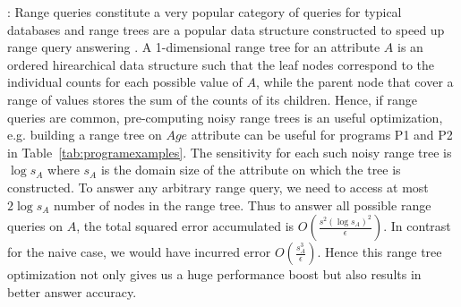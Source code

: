 \begin{comment}
For answering queries of the form $\phi=A_1==v_1\wedge \ldots  \wedge A_n==v_n$, ideally we just need to compute for $A_2==v_2\wedge \ldots \wedge A_n==v_n$ on $ct_{A,v}$ number of records starting from position $\sum_{i=1}^{i=v-1}ct_{A,i}$ of $\boldsymbol{\mathcal{\tilde{D}}}_{sort}$. 

However the \textsf{AS} has access only to the noisy CDF over the $k$ bins $ct_{A,i}$. Note that when $\bar{i}_{start}=\bar{\hat{\mathcal{C}}}[v-1] < \sum_{i=1}^{i=v-1}ct_{A,i}$ and $\bar{i}_{end}= \bar{\hat{\mathcal{C}}}[v-1] > i_{start}+ct_{A,v}$, i.e., the indices computed from the noisy values  saddle over the true records satisfying $A==v$, then although we end up loosing in performance a bit, we are still guaranteed to compute the exact non-noisy count for records satisfying $\phi$. 

In all other cases, we end up disregarding some of the records that satisfy $A==v$, some of these rejected records in fact might additionally satisfy $A_1==v_1 \wedge \ldots \wedge A_n==v_n$. Thus we might get inaccurate answer for query predicate $\phi$ (note that here we are talking about the encrypted true count of the given query predicate that is computed by the AS via a series of transformations before applying the LaplaceMechanism primitive).  An effective heuristic to tackle this can be to compensate for the expected laplacian error as follows  $\bar{i}_{start}= \bar{\hat{\mathcal{C}}}[v-1]-\frac{2}{\epsilon}$ and $\bar{i}_{end}=\bar{\hat{\mathcal{C}}}[v]+\frac{2}{\epsilon}$. Also note that answering differentially private  range queries   on attribute $A$ can also be directly done from the noisy CDF $\bar{\hat{\mathcal{C}}}$ 
\end{comment}



 
:
Range queries constitute a very popular category of queries for typical databases and range trees are a popular data structure constructed to speed up range query answering . 
A 1-dimensional range tree for an attribute $A$ is an ordered hirearchical data structure such that the leaf nodes correspond to the individual counts for each possible value of $A$, while the parent node that cover a range of values stores the sum of the counts of its children. Hence, if range queries are common, pre-computing noisy range trees is an useful optimization, e.g. building a range tree on $Age$ attribute can be useful for programs P1 and P2 in Table~\ref{tab:programexamples}. The sensitivity for each such noisy range tree is $\log s_A$ where $s_A$ is the domain size of the attribute on which the tree is constructed. To answer any arbitrary range query, we need to access at most $2\log s_A$ number of nodes in the range tree. Thus to answer all possible range queries on $A$, the total squared error accumulated is $O(\frac{s^2(\log s_A)^2 }{\epsilon})$. In contrast for the naive case, we would have incurred error $O(\frac{s_A^3}{\epsilon})$. Hence this range tree optimization not only gives us a huge performance boost but also results in better answer accuracy.


